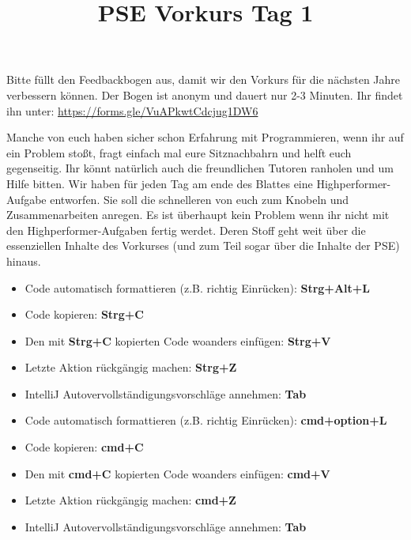 \documentclass{../../sheet}
\title{PSE Vorkurs Tag 1}
\begin{document}
\maketitle

Bitte füllt den Feedbackbogen aus, damit wir den Vorkurs für die nächsten Jahre verbessern können. Der Bogen ist anonym und dauert nur 2-3 Minuten. \newline Ihr findet ihn unter: \url{https://forms.gle/VuAPkwtCdcjug1DW6}

Manche von euch haben sicher schon Erfahrung mit Programmieren, wenn ihr auf ein Problem stoßt, fragt einfach mal eure Sitznachbahrn und helft euch gegenseitig. Ihr könnt natürlich auch die freundlichen Tutoren ranholen und um Hilfe bitten.
Wir haben für jeden Tag am ende des Blattes eine Highperformer-Aufgabe entworfen. Sie soll die schnelleren von euch zum Knobeln und Zusammenarbeiten anregen. Es ist überhaupt kein Problem wenn ihr nicht mit den Highperformer-Aufgaben fertig werdet. Deren Stoff geht weit über die essenziellen Inhalte des Vorkurses (und zum Teil sogar über die Inhalte der PSE) hinaus.


\begin{itemize}
  \item Code automatisch formattieren (z.B. richtig Einrücken): \textbf{Strg+Alt+L}
  \item Code kopieren: \textbf{Strg+C}
  \item Den mit \textbf{Strg+C} kopierten Code woanders einfügen: \textbf{Strg+V}
  \item Letzte Aktion rückgängig machen: \textbf{Strg+Z}
  \item IntelliJ Autovervollständigungsvorschläge annehmen: \textbf{Tab}
\end{itemize}

\begin{itemize}
  \item Code automatisch formattieren (z.B. richtig Einrücken): \textbf{cmd+option+L}
  \item Code kopieren: \textbf{cmd+C}
  \item Den mit \textbf{cmd+C} kopierten Code woanders einfügen: \textbf{cmd+V}
  \item Letzte Aktion rückgängig machen: \textbf{cmd+Z}
  \item IntelliJ Autovervollständigungsvorschläge annehmen: \textbf{Tab}
\end{itemize}
\end{document}
